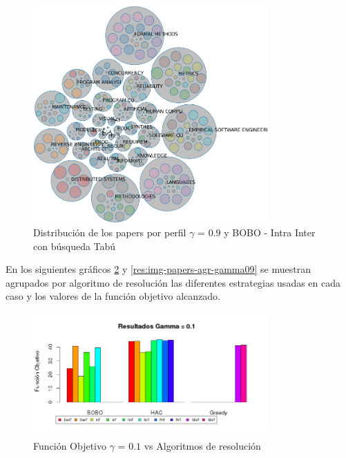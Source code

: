\begin{figure}[H]
  \centering
    \includegraphics[width=0.8\textwidth]{resultados/papers/BOBO/INTRA_INTER/bubbles-gamma-with-local-09.png}
  \caption{Distribución de los papers por perfil $\gamma$ = $0.9$ y BOBO - Intra Inter con búsqueda Tabú}
  \label{res:img-papers-bubbles-gamma09-hac-intra-inter-bobo}
\end{figure}

En los siguientes gráficos \ref{res:img-papers-agr-gamma01} y \ref{res:img-papers-agr-gamma09} se muestran agrupados por algoritmo de resolución las diferentes estrategias usadas en cada caso y los valores de la función objetivo alcanzado.

\begin{figure}[H]
  \centering
    \includegraphics[width=0.8\textwidth]{resultados/papers/Graficos_agrupados/gamma01.png}
  \caption{Función Objetivo $\gamma$ = $0.1$ vs Algoritmos de resolución}
  \label{res:img-papers-agr-gamma01}
\end{figure}

